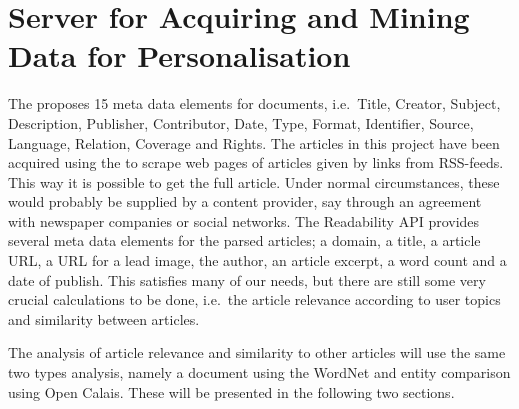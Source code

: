 \section{Server for Acquiring and Mining Data for Personalisation}
The \cite{DCMI} proposes 15 meta data elements for documents, i.e.\ Title, Creator, Subject, Description, Publisher, Contributor, Date, Type, Format, Identifier, Source, Language, Relation, Coverage and Rights. The articles in this project have been acquired using the \cite{Readability} to scrape web pages of articles given by links from RSS-feeds. This way it is possible to get the full article. Under normal circumstances, these would probably be supplied by a content provider, say through an agreement with newspaper companies or social networks. The Readability API provides several meta data elements for the parsed articles; a domain, a title, a article URL, a URL for a lead image, the author, an article excerpt, a word count and a date of publish. This satisfies many of our needs, but there are still some very crucial calculations to be done, i.e.\ the article relevance according to user topics and similarity between articles.

The analysis of article relevance and similarity to other articles will use the same two types analysis, namely a document using the WordNet and entity comparison using Open Calais. These will be presented in the following two sections.


